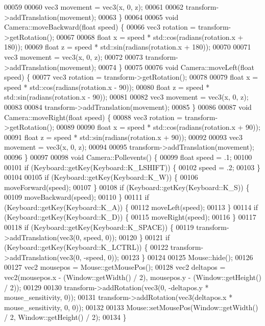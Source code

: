 \begin{DoxyCode}
00059 
00060     vec3 movement = vec3(x, 0, z);
00061 
00062     transform->addTranslation(movement);
00063 \}
00064 
00065 \textcolor{keywordtype}{void} Camera::moveBackward(\textcolor{keywordtype}{float} speed) \{
00066     vec3 rotation = transform->getRotation();
00067 
00068     \textcolor{keywordtype}{float} x = speed * std::cos(radians(rotation.x + 180));
00069     \textcolor{keywordtype}{float} z = speed * std::sin(radians(rotation.x + 180));
00070 
00071     vec3 movement = vec3(x, 0, z);
00072 
00073     transform->addTranslation(movement);
00074 \}
00075 
00076 \textcolor{keywordtype}{void} Camera::moveLeft(\textcolor{keywordtype}{float} speed) \{
00077     vec3 rotation = transform->getRotation();
00078 
00079     \textcolor{keywordtype}{float} x = speed * std::cos(radians(rotation.x - 90));
00080     \textcolor{keywordtype}{float} z = speed * std::sin(radians(rotation.x - 90));
00081 
00082     vec3 movement = vec3(x, 0, z);
00083 
00084     transform->addTranslation(movement);
00085 \}
00086 
00087 \textcolor{keywordtype}{void} Camera::moveRight(\textcolor{keywordtype}{float} speed) \{
00088     vec3 rotation = transform->getRotation();
00089 
00090     \textcolor{keywordtype}{float} x = speed * std::cos(radians(rotation.x + 90));
00091     \textcolor{keywordtype}{float} z = speed * std::sin(radians(rotation.x + 90));
00092 
00093     vec3 movement = vec3(x, 0, z);
00094 
00095     transform->addTranslation(movement);
00096 \}
00097 
00098 \textcolor{keywordtype}{void} Camera::Pollevents() \{
00099     \textcolor{keywordtype}{float} speed = .1;
00100 
00101     \textcolor{keywordflow}{if} (Keyboard::getKey(Keyboard::K\_LSHIFT)) \{
00102         speed = .2;
00103     \}
00104 
00105     \textcolor{keywordflow}{if} (Keyboard::getKey(Keyboard::K\_W)) \{
00106         moveForward(speed);
00107     \}
00108     \textcolor{keywordflow}{if} (Keyboard::getKey(Keyboard::K\_S)) \{
00109         moveBackward(speed);
00110     \}
00111     \textcolor{keywordflow}{if} (Keyboard::getKey(Keyboard::K\_A)) \{
00112         moveLeft(speed);
00113     \}
00114     \textcolor{keywordflow}{if} (Keyboard::getKey(Keyboard::K\_D)) \{
00115         moveRight(speed);
00116     \}
00117 
00118     \textcolor{keywordflow}{if} (Keyboard::getKey(Keyboard::K\_SPACE)) \{
00119         transform->addTranslation(vec3(0, speed, 0));
00120     \}
00121     \textcolor{keywordflow}{if} (Keyboard::getKey(Keyboard::K\_LCTRL)) \{
00122         transform->addTranslation(vec3(0, -speed, 0));
00123     \}
00124 
00125     Mouse::hide();
00126 
00127     vec2 mousepos = Mouse::getMousePos();
00128     vec2 deltapos = vec2(mousepos.x - (Window::getWidth() / 2), mousepos.y - (Window::getHeight() / 2));
00129 
00130     transform->addRotation(vec3(0, -deltapos.y * mouse\_sensitivity, 0));
00131     transform->addRotation(vec3(deltapos.x    * mouse\_sensitivity, 0, 0));
00132 
00133     Mouse::setMousePos(Window::getWidth() / 2, Window::getHeight() / 2);
00134 \}
\end{DoxyCode}
